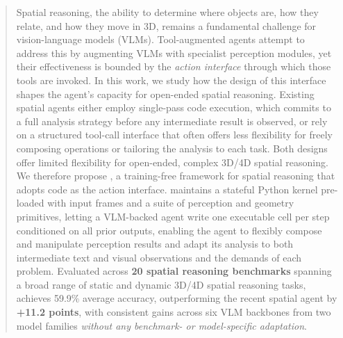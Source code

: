 \begin{abstract}
    Spatial reasoning, the ability to determine where objects are, how they relate, and how they move in 3D, remains a fundamental challenge for vision-language models (VLMs).
    Tool-augmented agents attempt to address this by augmenting VLMs with specialist perception modules, yet their effectiveness is bounded by the \emph{action interface} through which those tools are invoked.
    In this work, we study how the design of this interface shapes the agent's capacity for open-ended spatial reasoning.
    Existing spatial agents either employ single-pass code execution, which commits to a full analysis strategy before any intermediate result is observed, or rely on a structured tool-call interface that often offers less flexibility for freely composing operations or tailoring the analysis to each task. Both designs offer limited flexibility for open-ended, complex 3D/4D spatial reasoning.
    We therefore propose \textbf{\ours{}}, a training-free framework for spatial reasoning that adopts code as the action interface.
    \ours{} maintains a stateful Python kernel pre-loaded with input frames and a suite of perception and geometry primitives, letting a VLM-backed agent write one executable cell per step conditioned on all prior outputs, enabling the agent to flexibly compose and manipulate perception results and adapt its analysis to both intermediate text and visual observations and the demands of each problem.
    Evaluated across \textbf{20 spatial reasoning benchmarks} spanning a broad range of static and dynamic 3D/4D spatial reasoning tasks, \ours{} achieves 59.9\% average accuracy, outperforming the recent spatial agent by \textbf{+11.2 points}, with consistent gains across six VLM backbones from two model families \emph{without any benchmark- or model-specific adaptation}.
\end{abstract}
